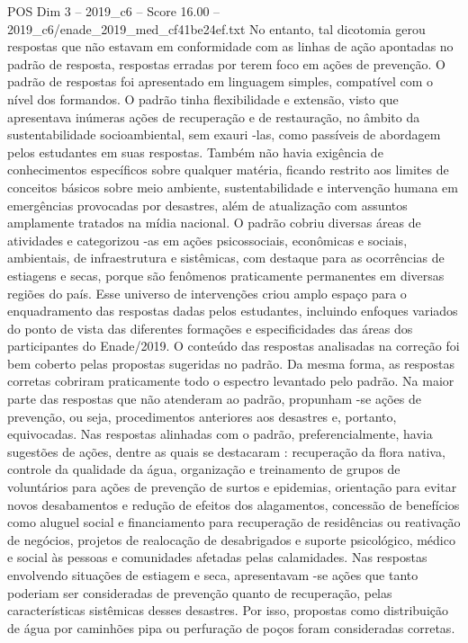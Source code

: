 \begin{textsample}{POS Dim 3 – 2019\_c6 – Score 16.00 – 2019\_c6/enade\_2019\_med\_cf41be24ef.txt}
No entanto, tal dicotomia gerou respostas que não estavam em conformidade com as linhas de ação apontadas no padrão de resposta, respostas erradas por terem foco em ações de prevenção.
O padrão de respostas foi apresentado em linguagem simples, compatível com o nível dos formandos.
O padrão tinha flexibilidade e extensão, visto que apresentava inúmeras ações de recuperação e de restauração, no âmbito da sustentabilidade socioambiental, sem exauri -las, como passíveis de abordagem pelos estudantes em suas respostas.
Também não havia exigência de conhecimentos específicos sobre qualquer matéria, ficando restrito aos limites de conceitos básicos sobre meio ambiente, sustentabilidade e intervenção humana em emergências provocadas por desastres, além de atualização com assuntos amplamente tratados na mídia nacional.
O padrão cobriu diversas áreas de atividades e categorizou -as em ações psicossociais, econômicas e sociais, ambientais, de infraestrutura e sistêmicas, com destaque para as ocorrências de estiagens e secas, porque são fenômenos praticamente permanentes em diversas regiões do país.
Esse universo de intervenções criou amplo espaço para o enquadramento das respostas dadas pelos estudantes, incluindo enfoques variados do ponto de vista das diferentes formações e especificidades das áreas dos participantes do Enade/2019.
O conteúdo das respostas analisadas na correção foi bem coberto pelas propostas sugeridas no padrão.
Da mesma forma, as respostas corretas cobriram praticamente todo o espectro levantado pelo padrão.
Na maior parte das respostas que não atenderam ao padrão, propunham -se ações de prevenção, ou seja, procedimentos anteriores aos desastres e, portanto, equivocadas.
Nas respostas alinhadas com o padrão, preferencialmente, havia sugestões de ações, dentre as quais se destacaram : recuperação da flora nativa, controle da qualidade da água, organização e treinamento de grupos de voluntários para ações de prevenção de surtos e epidemias, orientação para evitar novos desabamentos e redução de efeitos dos alagamentos, concessão de benefícios como aluguel social e financiamento para recuperação de residências ou reativação de negócios, projetos de realocação de desabrigados e suporte psicológico, médico e social às pessoas e comunidades afetadas pelas calamidades.
Nas respostas envolvendo situações de estiagem e seca, apresentavam -se ações que tanto poderiam ser consideradas de prevenção quanto de recuperação, pelas características sistêmicas desses desastres.
Por isso, propostas como distribuição de água por caminhões pipa ou perfuração de poços foram consideradas corretas.

\end{textsample}
